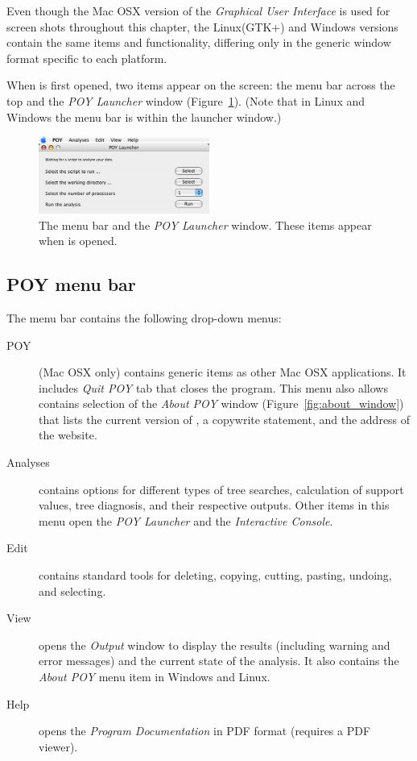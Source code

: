 Even though the Mac OSX version of the \emph{Graphical User Interface} is used for screen shots throughout this chapter, the Linux(GTK+) and Windows versions contain the same items and functionality, differing only in the generic window format specific to each platform.

When \poy is first opened, two items appear on the screen: the menu bar across the top and the \emph{POY Launcher} window (Figure~\ref{fig:menu_launcher_window}). (Note that in Linux and Windows the menu bar is within the launcher window.)

\begin{figure}[htpb]
    \begin{center}
        \includegraphics[width=0.5\textwidth]{doc/figures/menu_launcher_window.jpg}
    \end{center}
    \caption{The \poy menu bar and the \emph{POY Launcher} window. These items appear when \poy is opened.}
    \label{fig:menu_launcher_window}
\end{figure}

\subsection{POY menu bar}
The menu bar contains the following drop-down menus:
\begin{description}
\item[POY] (Mac OSX only) contains generic items as other Mac OSX applications. It includes \emph{Quit POY} tab that closes the program. This menu also allows contains selection of the \emph{About POY} window (Figure~\ref{fig:about_window}) that lists the current version of \poy, a copywrite statement, and the address of the \poy website.
\item[Analyses] contains options for different types of tree searches, calculation of support values, tree diagnosis, and their respective outputs. Other items in this menu open the \emph{POY Launcher} and the \emph{Interactive Console}.
\item[Edit] contains standard tools for deleting, copying, cutting, pasting, undoing, and selecting.
\item[View] opens the \emph{Output} window to display the results (including warning and error messages) and the current state of the analysis. It also contains the \emph{About POY} menu item in Windows and Linux.
\item[Help] opens the \poy \emph{Program Documentation} in PDF format (requires a PDF viewer).
\end{description}

